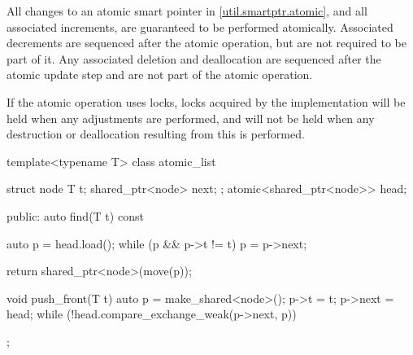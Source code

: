 \pnum
All changes to an atomic smart pointer in \ref{util.smartptr.atomic}, and
all associated  increments,
are guaranteed to be performed atomically.
Associated  decrements
are sequenced after the atomic operation,
but are not required to be part of it.
Any associated deletion and deallocation
are sequenced after the atomic update step and
are not part of the atomic operation.
\begin{note}
If the atomic operation uses locks,
locks acquired by the implementation
will be held when any  adjustments are performed, and
will not be held when any destruction or deallocation
resulting from this is performed.
\end{note}

\pnum
\begin{example}
\begin{codeblock}
template<typename T> class atomic_list {
  struct node {
    T t;
    shared_ptr<node> next;
  };
  atomic<shared_ptr<node>> head;

public:
  auto find(T t) const {
    auto p = head.load();
    while (p && p->t != t)
      p = p->next;

    return shared_ptr<node>(move(p));
  }

  void push_front(T t) {
    auto p = make_shared<node>();
    p->t = t;
    p->next = head;
    while (!head.compare_exchange_weak(p->next, p)) {}
  }
};
\end{codeblock}
\end{example}

